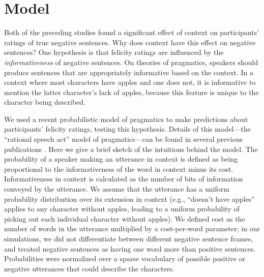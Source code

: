 \documentclass[10pt,letterpaper]{article}
\begin{document}
\section{Model}

Both of the preceding studies found a significant effect of context on participants' ratings of true negative sentences.  Why does context have this effect on negative sentences?  One hypothesis is that felicity ratings are influenced by the \emph{informativeness} of negative sentences. On theories of pragmatics, speakers should produce sentences that are appropriately informative based on the context.  In a context where most characters have apples and one does not, it is informative to mention the latter character's lack of apples, because this feature is unique to the character being described.

We used a recent probabilistic model of pragmatics to make predictions about participants' felicity ratings, testing this hypothesis. Details of this model---the ``rational speech act'' model of pragmatics---can be found in several previous publications \cite{frank2012,goodman2013,nordmeyer2014}. Here we give a brief sketch of the intuitions behind the model. The probability of a speaker making an utterance in context is defined as being  proportional to the informativeness of the word in context minus its cost.  Informativeness in context is calculated as the number of bits of information conveyed by the utterance.  We assume that the utterance has a uniform probability distribution over its extension in context (e.g., ``doesn't have apples'' applies to any character without apples, leading to a uniform probability of picking out each individual character without apples). We defined cost as the number of words in the utterance multiplied by a cost-per-word parameter; in our simulations, we did not differentiate between different negative sentence frames, and treated negative sentences as having one word more than positive sentences.  Probabilities were normalized over a sparse vocabulary of possible positive or negative utterances that could describe the characters.
\end{document}
